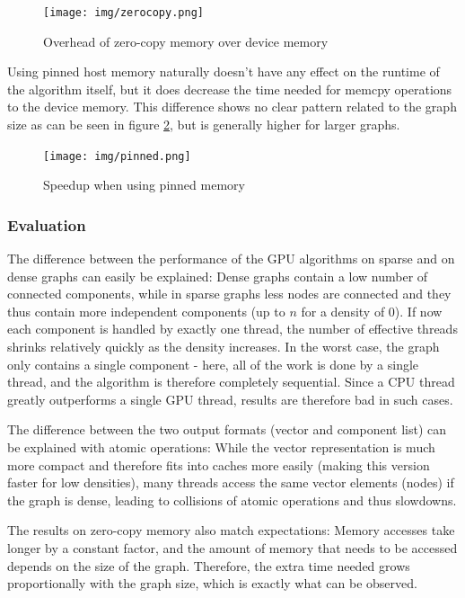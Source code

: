\documentclass[letta4 paper]{article}
\numberwithin{equation}{section}
\newcommand{\0}{\mathbf{0}}
\begin{document}
\begin{figure}
    \centering
    \texttt{[image: img/zerocopy.png]}
    \caption{Overhead of zero-copy memory over device memory}
    \label{fig:zerocopy_overhead}
\end{figure}

Using pinned host memory naturally doesn't have any effect on the runtime of the algorithm itself, but it does decrease the time needed for memcpy operations to the device memory. This difference shows no clear pattern related to the graph size as can be seen in figure \ref{fig:pinned}, but is generally higher for larger graphs.

\begin{figure}
    \centering
    \texttt{[image: img/pinned.png]}
    \caption{Speedup when using pinned memory}
    \label{fig:pinned}
\end{figure}

\subsubsection{Evaluation}
The difference between the performance of the GPU algorithms on sparse and on dense graphs can easily be explained: Dense graphs contain a low number of connected components, while in sparse graphs less nodes are connected and they thus contain more independent components (up to $n$ for a density of 0). If now each component is handled by exactly one thread, the number of effective threads shrinks relatively quickly as the density increases. In the worst case, the graph only contains a single component - here, all of the work is done by a single thread, and the algorithm is therefore completely sequential. Since a CPU thread greatly outperforms a single GPU thread, results are therefore bad in such cases.

The difference between the two output formats (vector and component list) can be explained with atomic operations: While the vector representation is much more compact and therefore fits into caches more easily (making this version faster for low densities), many threads access the same vector elements (nodes) if the graph is dense, leading to collisions of atomic operations and thus slowdowns.

The results on zero-copy memory also match expectations: Memory accesses take longer by a constant factor, and the amount of memory that needs to be accessed depends on the size of the graph. Therefore, the extra time needed grows proportionally with the graph size, which is exactly what can be observed.
\end{document}
